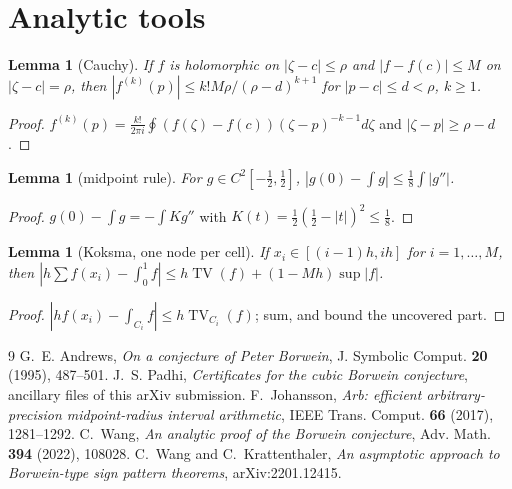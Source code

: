 \documentclass[11pt,reqno]{amsart}
\theoremstyle{plain}
\newtheorem{lemma}[theorem]{Lemma}
\theoremstyle{definition}
\DeclareMathOperator{\TV}{TV}
\begin{document}
\section{Analytic tools}\label{app:tools}

\begin{lemma}[Cauchy]\label{lem:cauchy}
If $f$ is holomorphic on $|\zeta-c|\le\rho$ and $|f-f(c)|\le M$ on $|\zeta-c|=\rho$, then $|f^{(k)}(p)|\le k!M\rho/(\rho-d)^{k+1}$ for
$|p-c|\le d<\rho$, $k\ge1$.
\end{lemma}
\begin{proof}
$f^{(k)}(p)=\frac{k!}{2\pi i}\oint(f(\zeta)-f(c))(\zeta-p)^{-k-1}d\zeta$ and $|\zeta-p|\ge\rho-d$.
\end{proof}

\begin{lemma}[midpoint rule]\label{lem:midpoint}
For $g\in C^2[-\frac12,\frac12]$, $|g(0)-\int g|\le\frac18\int|g''|$.
\end{lemma}
\begin{proof}
$g(0)-\int g=-\int K g''$ with $K(t)=\frac12(\frac12-|t|)^2\le\frac18$.
\end{proof}

\begin{lemma}[Koksma, one node per cell]\label{lem:koksma}
If $x_i\in[(i-1)h,ih]$ for $i=1,\dots,M$, then $|h\sum f(x_i)-\int_0^1f|\le h\TV(f)+(1-Mh)\sup|f|$.
\end{lemma}
\begin{proof}
$|hf(x_i)-\int_{C_i}f|\le h\TV_{C_i}(f)$; sum, and bound the uncovered part.
\end{proof}

\begin{thebibliography}{9}
 G.~E. Andrews, \emph{On a conjecture of Peter Borwein}, J. Symbolic Comput. \textbf{20} (1995), 487--501.
 J.~S. Padhi, \emph{Certificates for the cubic Borwein conjecture}, ancillary files of this arXiv submission.
 F.~Johansson, \emph{Arb: efficient arbitrary-precision midpoint-radius interval arithmetic}, IEEE Trans. Comput. \textbf{66} (2017), 1281--1292.
 C.~Wang, \emph{An analytic proof of the Borwein conjecture}, Adv. Math. \textbf{394} (2022), 108028.
 C.~Wang and C.~Krattenthaler, \emph{An asymptotic approach to Borwein-type sign pattern theorems}, arXiv:2201.12415.
\end{thebibliography}
\end{document}
